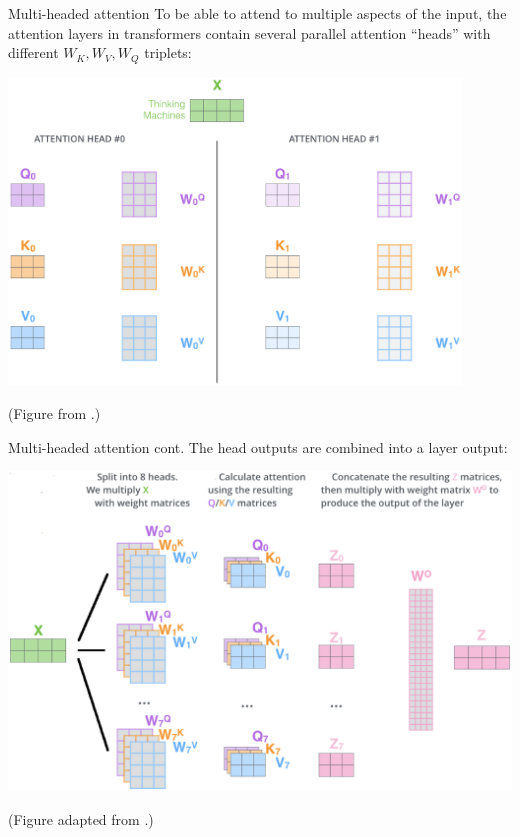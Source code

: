 \documentclass[style=upen, size=14pt]{powerdot}
\theoremstyle{definition}
\begin{document}
\begin{slide}[toc=Multiple heads]{Multi-headed attention}
  To be able to attend to multiple aspects of the input, the attention layers in
  transformers contain several parallel attention ``heads'' with different
  $W_K, W_V, W_Q$ triplets:
  
  \hspace{0.6cm}\includegraphics[width=0.9\textwidth]{figures/transformer_attention_heads_qkv.eps}
    
  \hspace{3cm}\footnotesize{(Figure from \cite{alammar2018illustrated}.)}
\end{slide}

\begin{slide}[toc=]{Multi-headed attention cont.}
  The head outputs are combined into a layer output:

  \includegraphics[width=1\textwidth]{figures/mhead2.eps}    

  \hspace{3cm}\footnotesize{(Figure adapted from
    \cite{alammar2018illustrated}.)}
\end{slide}
\end{document}
